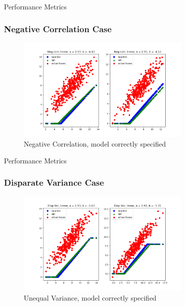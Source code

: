 \documentclass[11pt]{article}
\begin{document}
    \begin{table}[H]
        \centering
        \small
        \caption{Performance Metrics}
        \resizebox*{\columnwidth}{!}{}
    \end{table}

    \subsubsection{Negative Correlation Case}
    \begin{figure}[H]
        \centering
        \caption{Negative Correlation, model correctly specified}
        \includegraphics[width=0.75\textwidth]{../../output/figures/Exploration/neg_correlation_linear.png}
    \end{figure}

    \begin{table}[H]
        \centering
        \small
        \caption{Performance Metrics}
        \resizebox*{\columnwidth}{!}{}
    \end{table}

    \subsubsection{Disparate Variance Case}
    \begin{figure}[H]
        \centering
        \caption{Unequal Variance, model correctly specified}
        \includegraphics[width=0.75\textwidth]{../../output/figures/Exploration/disp_var_linear.png}
    \end{figure}
\end{document}
